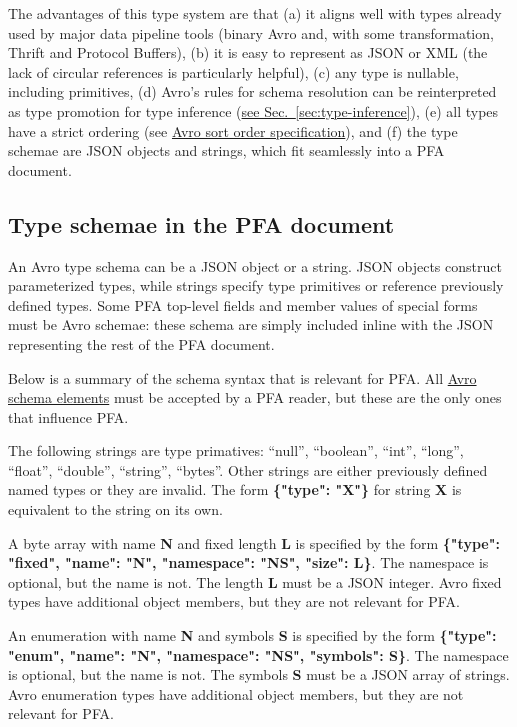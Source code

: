 \documentclass{article}
\newcommand{\PFAc}{\ttfamily\bfseries}
\newcommand{\PFAtp}{\ttfamily\bfseries}
\theoremstyle{definition}
\begin{document}
The advantages of this type system are that (a) it aligns well with types already used by major data pipeline tools (binary Avro and, with some transformation, Thrift and Protocol Buffers), (b) it is easy to represent as JSON or XML (the lack of circular references is particularly helpful), (c) any type is nullable, including primitives, (d) Avro's rules for schema resolution can be reinterpreted as type promotion for type inference (\hyperlink{hsec:type-inference}{see Sec.~\ref{sec:type-inference}}), (e) all types have a strict ordering (see \href{http://avro.apache.org/docs/1.7.6/spec.html#order}{Avro sort order specification}), and (f) the type schemae are JSON objects and strings, which fit seamlessly into a PFA document.

\subsection{Type schemae in the PFA document}

An Avro type schema can be a JSON object or a string.  JSON objects construct parameterized types, while strings specify type primitives or reference previously defined types.  Some PFA top-level fields and member values of special forms must be Avro schemae: these schema are simply included inline with the JSON representing the rest of the PFA document.

Below is a summary of the schema syntax that is relevant for PFA.  All \hyperlink{http://avro.apache.org/docs/1.7.6/spec.html}{Avro schema elements} must be accepted by a PFA reader, but these are the only ones that influence PFA.

The following strings are type primatives: ``null'', ``boolean'', ``int'', ``long'', ``float'', ``double'', ``string'', ``bytes''.  Other strings are either previously defined named types or they are invalid.  The form {\PFAc \{"type":$\!$ "X"\}} for string {\PFAtp X} is equivalent to the string on its own.

A byte array with name {\PFAtp N} and fixed length {\PFAtp L} is specified by the form {\PFAc \{"type":$\!$ "fixed", "name":$\!$ "N", "namespace":$\!$ "NS", "size":$\!$ L\}}.  The namespace is optional, but the name is not.  The length {\PFAtp L} must be a JSON integer.  Avro fixed types have additional object members, but they are not relevant for PFA.

An enumeration with name {\PFAtp N} and symbols {\PFAtp S} is specified by the form {\PFAc \{"type":$\!$ "enum", "name":$\!$ "N", "namespace":$\!$ "NS", "symbols":$\!$ S\}}.  The namespace is optional, but the name is not.  The symbols {\PFAtp S} must be a JSON array of strings.  Avro enumeration types have additional object members, but they are not relevant for PFA.
\end{document}
